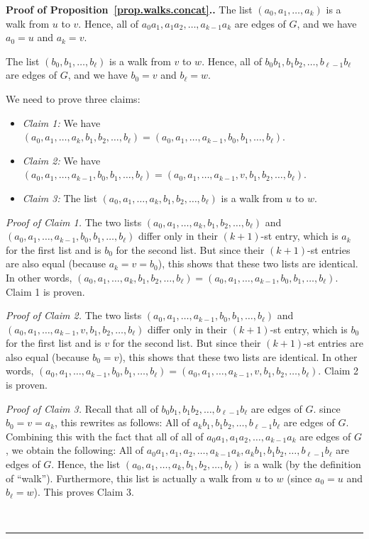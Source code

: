 \documentclass[numbers=enddot,12pt,final,onecolumn,notitlepage]{scrartcl}%
\theoremstyle{definition}
\newenvironment{proof}[1][Proof]{\noindent\textbf{#1.} }{\ \rule{0.5em}{0.5em}}
\newcommand{\tup}[1]{\left( #1 \right)}
\begin{document}
\begin{proof}[Proof of Proposition~\ref{prop.walks.concat}.]
The list $\tup{a_0, a_1, \ldots, a_k}$ is a walk from $u$ to $v$.
Hence, all of $a_0 a_1, a_1 a_2, \ldots, a_{k-1} a_k$ are edges of
$G$, and we have $a_0 = u$ and $a_k = v$.

The list $\tup{b_0, b_1, \ldots, b_\ell}$ is a walk from $v$ to $w$.
Hence, all of $b_0 b_1, b_1 b_2, \ldots, b_{\ell-1} b_\ell$ are edges
of $G$, and we have $b_0 = v$ and $b_\ell = w$.

We need to prove three claims:
\begin{itemize}
\item \textit{Claim 1:} We have
$\tup{a_0, a_1, \ldots, a_k, b_1, b_2, \ldots, b_\ell}
= \tup{a_0, a_1, \ldots, a_{k-1}, b_0, b_1, \ldots, b_\ell}$.
\item \textit{Claim 2:} We have
$\tup{a_0, a_1, \ldots, a_{k-1}, b_0, b_1, \ldots, b_\ell}
= \tup{a_0, a_1, \ldots, a_{k-1}, v, b_1, b_2, \ldots, b_\ell}$.
\item \textit{Claim 3:} The list
$\tup{a_0, a_1, \ldots, a_k, b_1, b_2, \ldots, b_\ell}$ is a walk
from $u$ to $w$.
\end{itemize}

\textit{Proof of Claim 1.} The two lists
$\tup{a_0, a_1, \ldots, a_k, b_1, b_2, \ldots, b_\ell}$
and \newline
$\tup{a_0, a_1, \ldots, a_{k-1}, b_0, b_1, \ldots, b_\ell}$
differ only in their $\tup{k+1}$-st entry, which is $a_k$ for the
first list and is $b_0$ for the second list. But since their
$\tup{k+1}$-st entries are also equal (because $a_k = v = b_0$),
this shows that these two lists are identical. In other words,
$\tup{a_0, a_1, \ldots, a_k, b_1, b_2, \ldots, b_\ell}
= \tup{a_0, a_1, \ldots, a_{k-1}, b_0, b_1, \ldots, b_\ell}$.
Claim 1 is proven.

\textit{Proof of Claim 2.} The two lists
$\tup{a_0, a_1, \ldots, a_{k-1}, b_0, b_1, \ldots, b_\ell}$
and \newline
$\tup{a_0, a_1, \ldots, a_{k-1}, v, b_1, b_2, \ldots, b_\ell}$
differ only in their $\tup{k+1}$-st entry, which is $b_0$ for the
first list and is $v$ for the second list. But since their
$\tup{k+1}$-st entries are also equal (because $b_0 = v$),
this shows that these two lists are identical. In other words,
$\tup{a_0, a_1, \ldots, a_{k-1}, b_0, b_1, \ldots, b_\ell}
= \tup{a_0, a_1, \ldots, a_{k-1}, v, b_1, b_2, \ldots, b_\ell}$.
Claim 2 is proven.

\textit{Proof of Claim 3.} Recall that all of
$b_0 b_1, b_1 b_2, \ldots, b_{\ell-1} b_\ell$ are edges of $G$.
since $b_0 = v = a_k$, this rewrites as follows: All of
$a_k b_1, b_1 b_2, \ldots, b_{\ell-1} b_\ell$ are edges of $G$.
Combining this with the fact that all of
all of $a_0 a_1, a_1 a_2, \ldots, a_{k-1} a_k$ are edges of $G$,
we obtain the following: All of
$a_0 a_1, a_1, a_2, \ldots, a_{k-1} a_k,
a_k b_1, b_1 b_2, \ldots, b_{\ell-1} b_\ell$ are edges of $G$. Hence,
the list
$\tup{a_0, a_1, \ldots, a_k, b_1, b_2, \ldots, b_\ell}$ is a walk
(by the definition of ``walk''). Furthermore, this list is actually
a walk from $u$ to $w$ (since $a_0 = u$ and $b_\ell = w$). This
proves Claim 3.


\end{proof}
\end{document}
